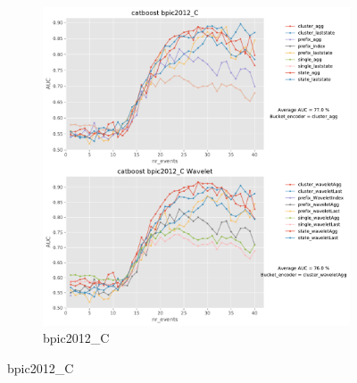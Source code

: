 \documentclass[twoside,11pt]{Latex/Classes/PhDthesisPSnPDF}
\begin{document}
\begin{figure}[!htbp]
\begin{subfigure}{0.48\textwidth}
		\includegraphics[width=\linewidth]{images/wavelet/graphs2cat/bpic2012_C.pdf}
		\caption{bpic2012\_C}
	\end{subfigure}
	

\end{figure}
\end{document}
